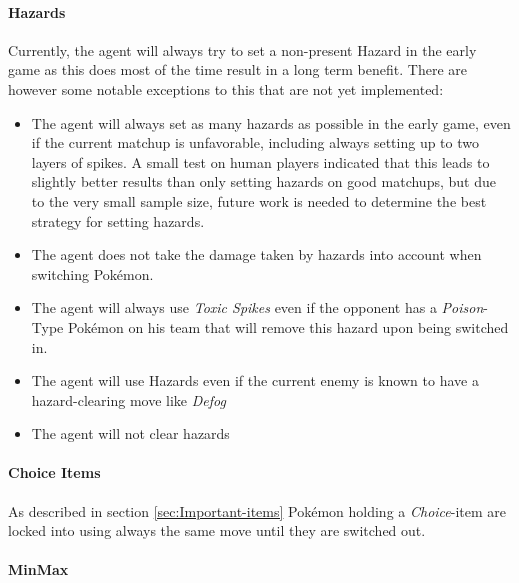 \paragraph{Hazards}
Currently, the agent will always try to set a non-present Hazard in the early game as this does most 
of the time result in a long term benefit. There are however some notable exceptions to this that 
are not yet implemented:
\begin{itemize}
  \item The agent will always set as many hazards as possible in the early game, even if the current matchup 
  is unfavorable, including always setting up to two layers of spikes. A small test on human players indicated
  that this leads to slightly better results than only setting hazards on good matchups, but due to the very
  small sample size, future work is needed to determine the best strategy for setting hazards.
  \item The agent does not take the damage taken by hazards into account when switching Pokémon. 
  \item The agent will always use \textit{Toxic Spikes} even if the opponent has a \textit{Poison}-Type
  Pokémon on his team that will remove this hazard upon being switched in.
  \item The agent will use Hazards even if the current enemy is known to have a hazard-clearing move like
  \textit{Defog} \cite{Bulbapedia:Defog}
  \item The agent will not clear hazards
\end{itemize}


\paragraph{Choice Items}
As described in section \ref{sec:Important-items} Pokémon holding a \textit{Choice}-item are locked into using always 
the same move until they are switched out. 

\paragraph{MinMax}

